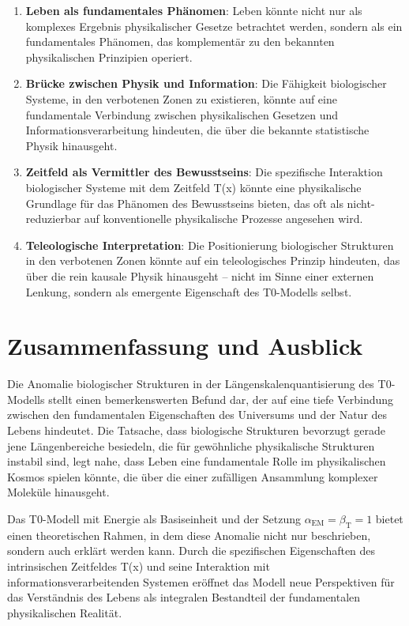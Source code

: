 \documentclass[12pt,a4paper]{article}
\newcommand{\Tfield}{T(x)}
\newcommand{\alphaEM}{\alpha_{\text{EM}}}
\newcommand{\betaT}{\beta_{\text{T}}}
\begin{document}
	\begin{enumerate}
		\item \textbf{Leben als fundamentales Phänomen}: Leben könnte nicht nur als komplexes Ergebnis physikalischer Gesetze betrachtet werden, sondern als ein fundamentales Phänomen, das komplementär zu den bekannten physikalischen Prinzipien operiert.
		
		\item \textbf{Brücke zwischen Physik und Information}: Die Fähigkeit biologischer Systeme, in den \glqq verbotenen Zonen\grqq{} zu existieren, könnte auf eine fundamentale Verbindung zwischen physikalischen Gesetzen und Informationsverarbeitung hindeuten, die über die bekannte statistische Physik hinausgeht.
		
		\item \textbf{Zeitfeld als Vermittler des Bewusstseins}: Die spezifische Interaktion biologischer Systeme mit dem Zeitfeld \Tfield{} könnte eine physikalische Grundlage für das Phänomen des Bewusstseins bieten, das oft als nicht-reduzierbar auf konventionelle physikalische Prozesse angesehen wird.
		
		\item \textbf{Teleologische Interpretation}: Die Positionierung biologischer Strukturen in den verbotenen Zonen könnte auf ein teleologisches Prinzip hindeuten, das über die rein kausale Physik hinausgeht – nicht im Sinne einer externen Lenkung, sondern als emergente Eigenschaft des T0-Modells selbst.
	\end{enumerate}
	
	\section{Zusammenfassung und Ausblick}
	\label{sec:zusammenfassung_ausblick}
	
	Die Anomalie biologischer Strukturen in der Längen\-skalen\-quantisierung des T0-Modells stellt einen bemerkenswerten Befund dar, der auf eine tiefe Verbindung zwischen den fundamentalen Eigenschaften des Universums und der Natur des Lebens hindeutet. Die Tatsache, dass biologische Strukturen bevorzugt gerade jene Längen\-bereiche besiedeln, die für gewöhnliche physikalische Strukturen instabil sind, legt nahe, dass Leben eine fundamentale Rolle im physikalischen Kosmos spielen könnte, die über die einer zufälligen Ansammlung komplexer Moleküle hinausgeht.
	
	Das T0-Modell mit Energie als Basis\-einheit und der Setzung $\alphaEM = \betaT = 1$ bietet einen theoretischen Rahmen, in dem diese Anomalie nicht nur beschrieben, sondern auch erklärt werden kann. Durch die spezifischen Eigenschaften des intrinsischen Zeitfeldes \Tfield{} und seine Interaktion mit informationsverarbeitenden Systemen eröffnet das Modell neue Perspektiven für das Verständnis des Lebens als integralen Bestandteil der fundamentalen physikalischen Realität.
	
\end{document}
